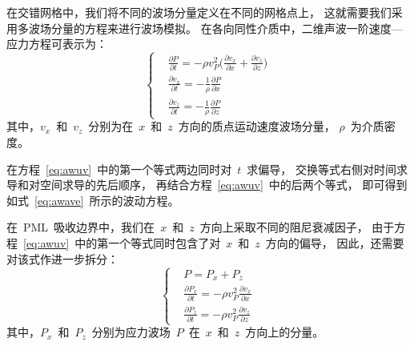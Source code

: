 \documentclass[UTF8]{ctexart}
\begin{document}
在交错网格中，我们将不同的波场分量定义在不同的网格点上，
这就需要我们采用多波场分量的方程来进行波场模拟。
在各向同性介质中，二维声波一阶速度—应力方程可表示为：
\begin{equation}\label{eq:awuv}
\left\{ \begin{aligned}
& \frac{\partial P}{\partial t}=-\rho v_P^2 \big(\frac{\partial v_x}{\partial x}+\frac{\partial v_z}{\partial z} \big) \\
& \frac{\partial v_x}{\partial t}=-\frac{1}{\rho} \frac{\partial P}{\partial x} \\
& \frac{\partial v_z}{\partial t}=-\frac{1}{\rho} \frac{\partial P}{\partial z}
\end{aligned} \right.
\end{equation}
其中，$v_x$~和~$v_z$~分别为在~$x$~和~$z$~方向的质点运动速度波场分量，
$\rho$~为介质密度。

在方程~\eqref{eq:awuv}~中的第一个等式两边同时对~$t$~求偏导，
交换等式右侧对时间求导和对空间求导的先后顺序，
再结合方程~\eqref{eq:awuv}~中的后两个等式，
即可得到如式~\eqref{eq:awave}~所示的波动方程。

在~PML~吸收边界中，我们在~$x$~和~$z$~方向上采取不同的阻尼衰减因子，
由于方程~\eqref{eq:awuv}~中的第一个等式同时包含了对~$x$~和~$z$~方向的偏导，
因此，还需要对该式作进一步拆分：
\begin{equation}\label{eq:Pxz}
\left\{ \begin{aligned}
& P=P_x+P_z \\
& \frac{\partial P_x}{\partial t}=-\rho v_P^2 \frac{\partial v_x}{\partial x} \\
& \frac{\partial P_z}{\partial t}=-\rho v_P^2 \frac{\partial v_z}{\partial z}
\end{aligned} \right.
\end{equation}
其中，$P_x$~和~$P_z$~分别为应力波场~$P$~在~$x$~和~$z$~方向上的分量。
\end{document}
